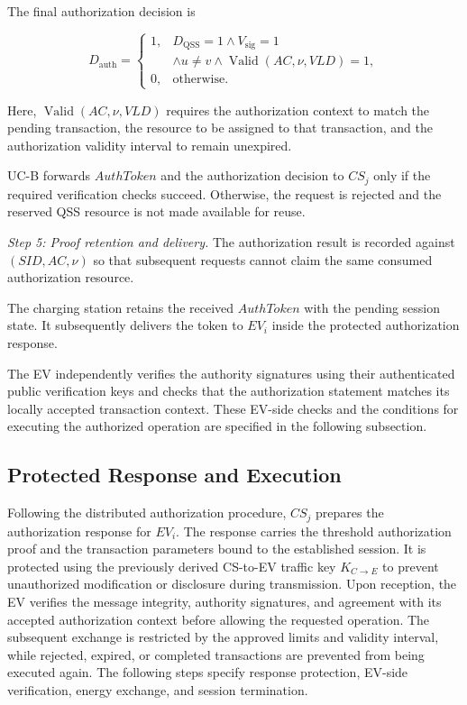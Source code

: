 \documentclass[twocolumn,10pt,journal]{IEEEtran}
\begin{document}
The final authorization decision is

\begin{equation}
D_{\mathrm{auth}}=
\begin{cases}
1, &
D_{\mathrm{QSS}}=1
\land V_{\mathrm{sig}}=1\\
&\land u\neq v
\land \operatorname{Valid}(AC,\nu,VLD)=1,\\[2pt]
0, & \text{otherwise}.
\end{cases}
\label{eq:qsv2g_final_authorization_decision}
\end{equation}

Here, $\operatorname{Valid}(AC,\nu,VLD)$
requires the authorization context to match
the pending transaction, the resource to
be assigned to that transaction, and the
authorization validity interval to remain
unexpired.

UC-B forwards $AuthToken$ and the authorization
decision to $CS_j$ only if the required
verification checks succeed. Otherwise,
the request is rejected and the reserved
QSS resource is not made available for reuse.

\textit{Step 5: Proof retention and delivery.}
The authorization result is recorded against
$(SID,AC,\nu)$ so that subsequent requests
cannot claim the same consumed authorization
resource.

The charging station retains the received
$AuthToken$ with the pending session state.
It subsequently delivers the token to $EV_i$
inside the protected authorization response.

The EV independently verifies the authority
signatures using their authenticated public
verification keys and checks that the
authorization statement matches its locally
accepted transaction context. These
EV-side checks and the conditions for
executing the authorized operation are
specified in the following subsection.

\subsection{Protected Response and Execution}
\label{subsec:qsv2g_protected_execution}

Following the distributed authorization procedure,
$CS_j$ prepares the authorization response for $EV_i$.
The response carries the threshold authorization proof
and the transaction parameters bound to the established
session. It is protected using the previously derived
CS-to-EV traffic key $K_{C\to E}$ to prevent unauthorized
modification or disclosure during transmission.
Upon reception, the EV verifies the message integrity,
authority signatures, and agreement with its accepted
authorization context before allowing the requested
operation. The subsequent exchange is restricted by
the approved limits and validity interval, while
rejected, expired, or completed transactions are
prevented from being executed again. The following
steps specify response protection, EV-side verification,
energy exchange, and session termination.
\end{document}
